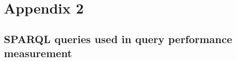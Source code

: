 \chapter{Appendix 2}

\section{SPARQL queries used in query performance measurement}\label{sec:queries}
